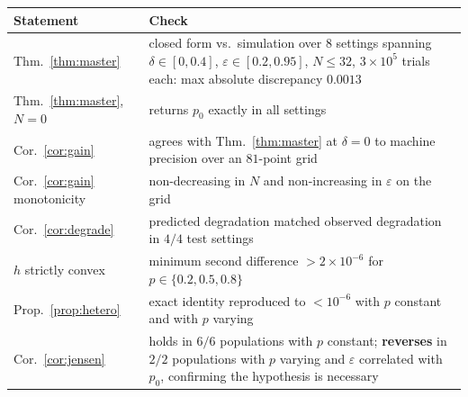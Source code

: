 \documentclass[11pt]{article}
\begin{document}
\begin{center}\small
\begin{tabular}{@{}p{3.2cm}p{4.2cm}@{}}
\toprule
Statement & Check \\
\midrule
Thm.~\ref{thm:master} & closed form vs.\ simulation over 8 settings spanning $\delta\in[0,0.4]$, $\varepsilon\in[0.2,0.95]$, $N\le32$, $3\times10^5$ trials each: max absolute discrepancy $0.0013$ \\[2pt]
Thm.~\ref{thm:master}, $N{=}0$ & returns $p_0$ exactly in all settings \\[2pt]
Cor.~\ref{cor:gain} & agrees with Thm.~\ref{thm:master} at $\delta=0$ to machine precision over an $81$-point grid \\[2pt]
Cor.~\ref{cor:gain} monotonicity & non-decreasing in $N$ and non-increasing in $\varepsilon$ on the grid \\[2pt]
Cor.~\ref{cor:degrade} & predicted degradation matched observed degradation in $4/4$ test settings \\[2pt]
$h$ strictly convex & minimum second difference $>2\times10^{-6}$ for $p\in\{0.2,0.5,0.8\}$ \\[2pt]
Prop.~\ref{prop:hetero} & exact identity reproduced to $<10^{-6}$ with $p$ constant and with $p$ varying \\[2pt]
Cor.~\ref{cor:jensen} & holds in $6/6$ populations with $p$ constant; \textbf{reverses} in $2/2$ populations with $p$ varying and $\varepsilon$ correlated with $p_0$, confirming the hypothesis is necessary \\
\bottomrule
\end{tabular}
\end{center}
\end{document}
